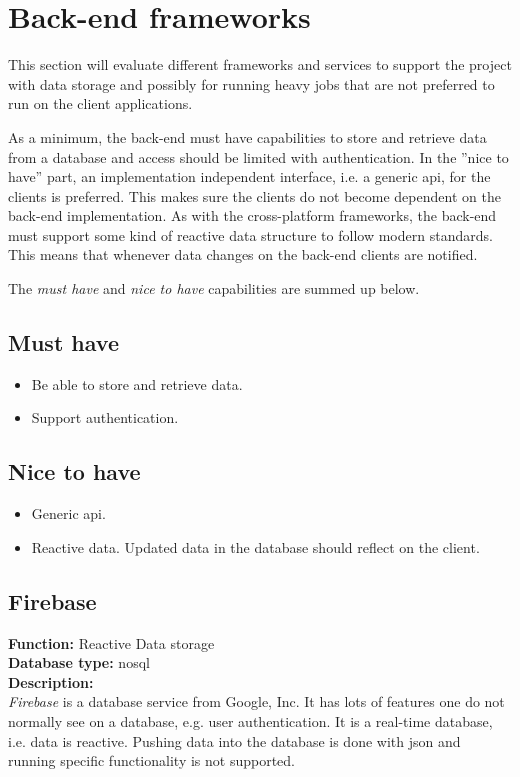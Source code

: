 \section{Back-end frameworks}
This section will evaluate different frameworks and services to support the project with data storage and possibly for running heavy jobs that are not preferred to run on the client applications.

As a minimum, the back-end must have capabilities to store and retrieve data from a database and access should be limited with authentication.
In the ''nice to have'' part, an implementation independent interface, i.e. a generic \gls{api}, for the clients is preferred.
This makes sure the clients do not become dependent on the back-end implementation.
As with the cross-platform frameworks, the back-end must support some kind of reactive data structure to follow modern standards.
This means that whenever data changes on the back-end clients are notified.

The \textit{must have} and \textit{nice to have} capabilities are summed up below.

\subsection*{Must have}
\begin{itemize}
	\item Be able to store and retrieve data.
	\item Support authentication.
\end{itemize}

\subsection*{Nice to have}
\begin{itemize}
	\item Generic \gls{api}.
	\item Reactive data. Updated data in the database should reflect on the client.
\end{itemize}

\subsection*{Firebase}
\textbf{Function:} Reactive Data storage
\\
\textbf{Database type:} \gls{nosql}
\\
\textbf{Description:}
\\
\textit{Firebase} is a database service from Google, Inc.
It has lots of features one do not normally see on a database, e.g. user authentication.
It is a real-time database, i.e. data is reactive.
Pushing data into the database is done with \gls{json} and running specific functionality is not supported.

